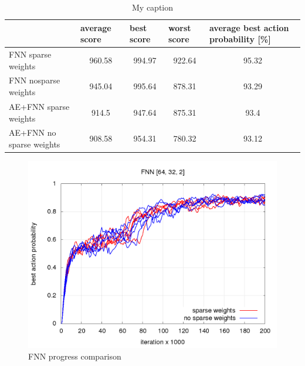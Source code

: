 \documentclass[10pt,a4paper]{article}
\begin{document}
\begin{table}[]
\centering
\caption{My caption}
\label{my-label}
\begin{tabular}{|l|c|c|c|c|}
\hline
                         & \multicolumn{1}{l|}{average score} & \multicolumn{1}{l|}{best score} & \multicolumn{1}{l|}{worst score} & \multicolumn{1}{l|}{average best action probability {[}\%{]}} \\ \hline
FNN sparse weights       & 960.58                             & 994.97                          & 922.64                           & 95.32                                                         \\ \hline
FNN nosparse weights     & 945.04                             & 995.64                          & 878.31                           & 93.29                                                         \\ \hline
AE+FNN sparse weights    & 914.5                              & 947.64                          & 875.31                           & 93.4                                                          \\ \hline
AE+FNN no sparse weights & 908.58                             & 954.31                          & 780.32                           & 93.12                                                         \\ \hline
\end{tabular}
\end{table}

\begin{figure}[!h]
  \centering
  \includegraphics[scale=0.4]{../../results/rl_arcade/fnn_progress/training_progress.png}
  \caption{FNN progress comparison}
  \label{img:FNN progress comparison}
\end{figure}
\end{document}
